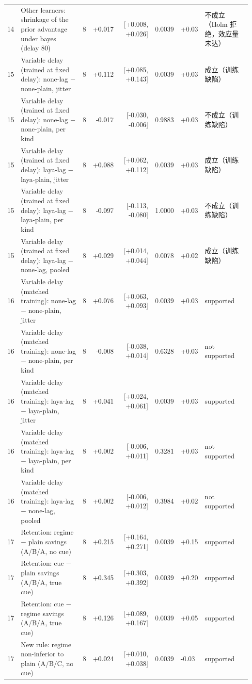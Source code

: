 \begin{table}[t]
{\begin{tabular}{@{}llrrrrll@{}}
14 & Other learners: shrinkage of the prior advantage under bayes (delay 80) & 8 & +0.017 & [+0.008, +0.026] & 0.0039 & +0.03 & 不成立（Holm 拒绝，效应量未达） \\
15 & Variable delay (trained at fixed delay): none-lag $-$ none-plain, jitter & 8 & +0.112 & [+0.085, +0.143] & 0.0039 & +0.03 & 成立（训练缺陷） \\
15 & Variable delay (trained at fixed delay): none-lag $-$ none-plain, per kind & 8 & -0.017 & [-0.030, -0.006] & 0.9883 & +0.03 & 不成立（训练缺陷） \\
15 & Variable delay (trained at fixed delay): laya-lag $-$ laya-plain, jitter & 8 & +0.088 & [+0.062, +0.112] & 0.0039 & +0.03 & 成立（训练缺陷） \\
15 & Variable delay (trained at fixed delay): laya-lag $-$ laya-plain, per kind & 8 & -0.097 & [-0.113, -0.080] & 1.0000 & +0.03 & 不成立（训练缺陷） \\
15 & Variable delay (trained at fixed delay): laya-lag $-$ none-lag, pooled & 8 & +0.029 & [+0.014, +0.044] & 0.0078 & +0.02 & 成立（训练缺陷） \\
16 & Variable delay (matched training): none-lag $-$ none-plain, jitter & 8 & +0.076 & [+0.063, +0.093] & 0.0039 & +0.03 & supported \\
16 & Variable delay (matched training): none-lag $-$ none-plain, per kind & 8 & -0.008 & [-0.038, +0.014] & 0.6328 & +0.03 & not supported \\
16 & Variable delay (matched training): laya-lag $-$ laya-plain, jitter & 8 & +0.041 & [+0.024, +0.061] & 0.0039 & +0.03 & supported \\
16 & Variable delay (matched training): laya-lag $-$ laya-plain, per kind & 8 & +0.002 & [-0.006, +0.011] & 0.3281 & +0.03 & not supported \\
16 & Variable delay (matched training): laya-lag $-$ none-lag, pooled & 8 & +0.002 & [-0.006, +0.012] & 0.3984 & +0.02 & not supported \\
17 & Retention: regime $-$ plain savings (A/B/A, no cue) & 8 & +0.215 & [+0.164, +0.271] & 0.0039 & +0.15 & supported \\
17 & Retention: cue $-$ plain savings (A/B/A, true cue) & 8 & +0.345 & [+0.303, +0.392] & 0.0039 & +0.20 & supported \\
17 & Retention: cue $-$ regime savings (A/B/A, true cue) & 8 & +0.126 & [+0.089, +0.167] & 0.0039 & +0.05 & supported \\
17 & New rule: regime non-inferior to plain (A/B/C, no cue) & 8 & +0.024 & [+0.010, +0.038] & 0.0039 & -0.03 & supported \\

\end{tabular}}
\end{table}

